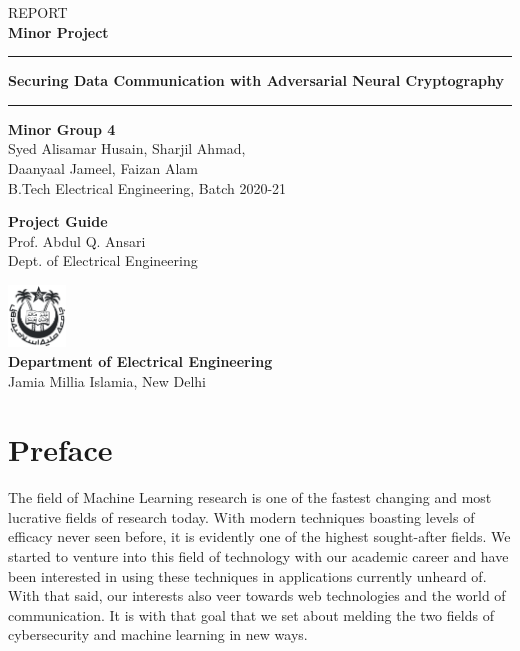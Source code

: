 \documentclass[a4paper]{article}
\begin{document}
  \begin{titlepage}
    \vspace*{\fill}
    \begin{center}
      {\large REPORT}\\[0.1in]
      {\bfseries{\Huge Minor Project}}
      \vspace{0.5in}
      \par\noindent\rule{\textwidth}{0.5pt}

      \vspace{0.25in}
      {\bfseries {\LARGE Securing Data Communication with Adversarial Neural Cryptography}}\\
      \vspace{0.2in}
      \par\noindent\rule{\textwidth}{0.5pt}
      \vspace{2in}

      {\bfseries Minor Group 4}\\
      {\large Syed Alisamar Husain, Sharjil Ahmad,\\ Daanyaal Jameel, Faizan Alam\\}
      B.Tech Electrical Engineering, Batch 2020-21\\
      \vspace{0.5in}

      {\bfseries Project Guide}\\
      {\large Prof. Abdul Q. Ansari\\}
      Dept. of Electrical Engineering
      \vspace{1in}

      \includegraphics[height=0.65in]{../ref/JMI.png}\\
      {\bfseries Department of Electrical Engineering} \\
      Jamia Millia Islamia, New Delhi
      \thispagestyle{empty}
    \end{center}
    \vspace*{\fill}
  \end{titlepage}

  \newpage
  \vspace*{1in}
  \section*{Preface}
  The field of Machine Learning research is one of the fastest changing and most lucrative fields
  of research today. With modern techniques boasting levels of efficacy never seen before, it is
  evidently one of the highest sought-after fields. We started to venture into this field of technology
  with our academic career and have been interested in using these techniques in applications currently
  unheard of. With that said, our interests also veer towards web technologies and the world
  of communication. It is with that goal that we set about melding the two fields of cybersecurity
  and machine learning in new ways.
\end{document}
